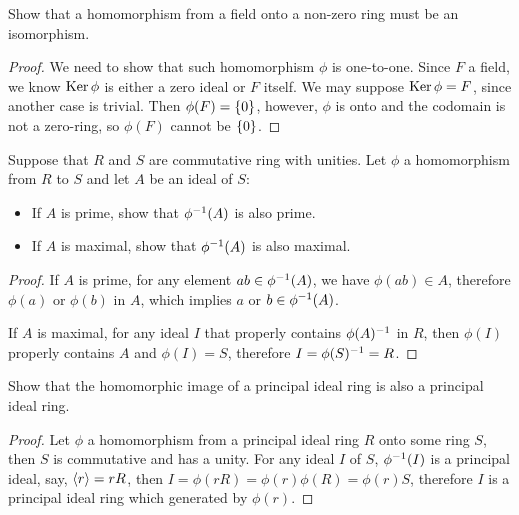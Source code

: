 \documentclass[../main.tex]{subfiles}
\begin{document}
\setcounter{exercise}{51}
\begin{exercise}
  Show that a homomorphism from a field onto a non-zero ring
  must be an isomorphism.
\end{exercise}
\begin{proof}
  We need to show that such homomorphism $\phi$ is one-to-one.
  Since $F$ a field, we know $\operatorname{Ker} \phi$ is 
  either a zero ideal or $F$ itself. We may suppose $\operatorname{Ker} \phi = F$,
  since another case is trivial.
  Then $\phi(F) = \{0\}$, however, $\phi$ is onto and the codomain is not a zero-ring,
  so $\phi(F)$ cannot be $\{0\}$.
\end{proof}

\begin{exercise}
  Suppose that $R$ and $S$ are commutative ring with unities.
  Let $\phi$ a homomorphism from $R$ to $S$ and let $A$
  be an ideal of $S$:
  \begin{itemize}
    \item If $A$ is prime, show that $\phi^{-1}(A)$ is also prime.
    \item If $A$ is maximal, show that $\phi^{-1}(A)$ is also maximal.
  \end{itemize}
\end{exercise}
\begin{proof}
  If $A$ is prime, for any element $ab \in \phi^{-1}(A)$,
  we have $\phi(ab) \in A$, therefore $\phi(a)$ or $\phi(b)$ in $A$,
  which implies $a$ or $b \in \phi^{-1}(A)$.

  If $A$ is maximal, for any ideal $I$ that properly contains $\phi(A)^{-1}$ in $R$,
  then $\phi(I)$ properly contains $A$ and $\phi(I) = S$,
  therefore $I = \phi(S)^{-1} = R$.
\end{proof}

\begin{exercise}
  Show that the homomorphic image of a principal ideal ring is also a principal ideal ring.
\end{exercise}
\begin{proof}
  Let $\phi$ a homomorphism from a principal ideal ring $R$ onto some ring $S$,
  then $S$ is commutative and has a unity. For any ideal $I$ of $S$,
  $\phi^{-1}(I)$ is a principal ideal, say, $\langle r \rangle = rR$,
  then $I = \phi(rR) = \phi(r)\phi(R) = \phi(r)S$, therefore $I$ is a principal ideal ring
  which generated by $\phi(r)$.
\end{proof}
\end{document}

